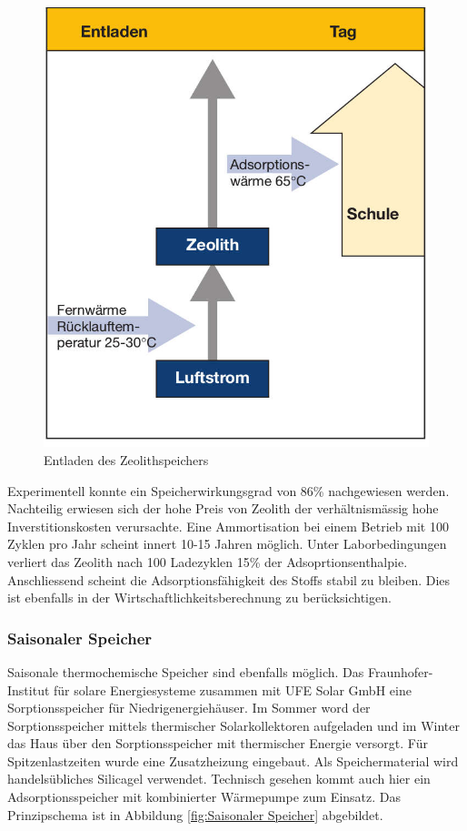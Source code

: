 \documentclass[11pt,a4paper]{scrartcl}
\begin{document}
{\begin{figure}[h!]
\begin{center}
\includegraphics[scale=1]{images/Entladen.jpg}
\caption{Entladen des Zeolithspeichers \cite{BINE2}}
\label{fig:Entladen}
\end{center}
\end{figure}
Experimentell konnte ein Speicherwirkungsgrad von 86\% nachgewiesen werden.
Nachteilig erwiesen sich der hohe Preis von Zeolith der verhältnismässig hohe
Inverstitionskosten verursachte. Eine Ammortisation bei einem Betrieb mit 100
Zyklen pro Jahr scheint innert 10-15 Jahren möglich. Unter Laborbedingungen
verliert das Zeolith nach 100 Ladezyklen 15\% der Adsoprtionsenthalpie.
Anschliessend scheint die Adsorptionsfähigkeit des Stoffs stabil zu bleiben.
Dies ist ebenfalls in der Wirtschaftlichkeitsberechnung zu berücksichtigen.
\cite{BINE2}

\subsubsection{Saisonaler Speicher}
Saisonale thermochemische Speicher sind ebenfalls möglich. Das Fraunhofer-
Institut für solare Energiesysteme zusammen mit UFE Solar GmbH eine
Sorptionsspeicher für Niedrigenergiehäuser. Im Sommer word der Sorptionsspeicher
mittels thermischer Solarkollektoren aufgeladen und im Winter das Haus über den
Sorptionsspeicher mit thermischer Energie versorgt. Für Spitzenlastzeiten wurde
eine Zusatzheizung eingebaut. Als Speichermaterial wird handelsübliches
Silicagel verwendet. Technisch gesehen kommt auch hier ein Adsorptionsspeicher
mit kombinierter Wärmepumpe zum Einsatz. Das Prinzipschema ist in Abbildung \ref{fig:Saisonaler Speicher}
abgebildet.

}
\end{document}
